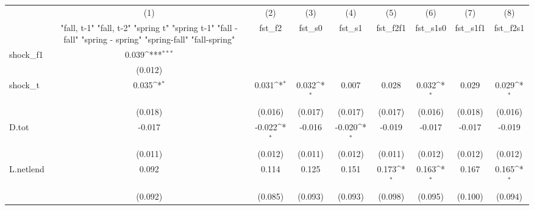 {
\def\sym#1{\ifmmode^{#1}\else\(^{#1}\)\fi}
\begin{tabular}{l*{8}{c}}
\toprule
            &\multicolumn{1}{c}{(1)}&\multicolumn{1}{c}{(2)}&\multicolumn{1}{c}{(3)}&\multicolumn{1}{c}{(4)}&\multicolumn{1}{c}{(5)}&\multicolumn{1}{c}{(6)}&\multicolumn{1}{c}{(7)}&\multicolumn{1}{c}{(8)}\\
            &\multicolumn{1}{c}{  "fall, t-1" "fall, t-2" "spring t" "spring t-1"  "fall - fall" "spring - spring" "spring-fall" "fall-spring" }&\multicolumn{1}{c}{fst\_f2}&\multicolumn{1}{c}{fst\_s0}&\multicolumn{1}{c}{fst\_s1}&\multicolumn{1}{c}{fst\_f2f1}&\multicolumn{1}{c}{fst\_s1s0}&\multicolumn{1}{c}{fst\_s1f1}&\multicolumn{1}{c}{fst\_f2s1}\\
\midrule
shock\_f1    &       0.039\sym{***}&                     &                     &                     &                     &                     &                     &                     \\
            &     (0.012)         &                     &                     &                     &                     &                     &                     &                     \\
\addlinespace
shock\_t     &       0.035\sym{*}  &       0.031\sym{*}  &       0.032\sym{*}  &       0.007         &       0.028         &       0.032\sym{*}  &       0.029         &       0.029\sym{*}  \\
            &     (0.018)         &     (0.016)         &     (0.017)         &     (0.017)         &     (0.017)         &     (0.016)         &     (0.018)         &     (0.016)         \\
\addlinespace
D.tot       &      -0.017         &      -0.022\sym{*}  &      -0.016         &      -0.020\sym{*}  &      -0.019         &      -0.017         &      -0.017         &      -0.019         \\
            &     (0.011)         &     (0.012)         &     (0.011)         &     (0.012)         &     (0.011)         &     (0.012)         &     (0.012)         &     (0.012)         \\
\addlinespace
L.netlend   &       0.092         &       0.114         &       0.125         &       0.151         &       0.173\sym{*}  &       0.163\sym{*}  &       0.167         &       0.165\sym{*}  \\
            &     (0.092)         &     (0.085)         &     (0.093)         &     (0.093)         &     (0.098)         &     (0.095)         &     (0.100)         &     (0.094)         \\

\end{tabular}}

